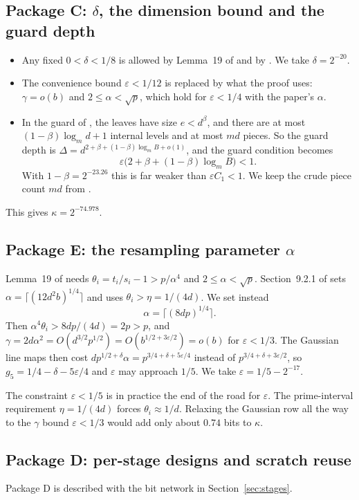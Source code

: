 \subsection{Package C: $\delta$, the dimension bound and the guard depth}
\begin{itemize}[leftmargin=*]
\item Any fixed $0<\delta<1/8$ is allowed by Lemma~19 of \cite{OAI} and by \cite[Lemma~2.12]{HvdH}. We take $\delta = 2^{-20}$.
\item The convenience bound $\varepsilon < 1/12$ is replaced by what the proof uses: $\gamma = o(b)$ and $2 \le \alpha < \sqrt p$, which hold for $\varepsilon < 1/4$ with the paper's $\alpha$.
\item In the guard of \cite[Prop.~14]{OAI}, the leaves have size $e < d^\beta$, and there are at most $(1-\beta)\log_m d + 1$ internal levels and at most $md$ pieces. So the guard depth is $\Delta = d^{2+\beta+(1-\beta)\log_m B + o(1)}$, and the guard condition becomes
\[
\varepsilon\bigl(2+\beta+(1-\beta)\log_m B\bigr) < 1 .
\]
With $1-\beta = 2^{-23.26}$ this is far weaker than $\varepsilon C_1 < 1$. We keep the crude piece count $md$ from \cite{OAI}.
\end{itemize}
This gives $\kappa = 2^{-74.978}$.

\subsection{Package E: the resampling parameter $\alpha$}
Lemma~19 of \cite{OAI} needs $\theta_i = t_i/s_i - 1 > p/\alpha^4$ and $2 \le \alpha < \sqrt p$. Section~9.2.1 of \cite{OAI} sets $\alpha = \lceil (12 d^2 b)^{1/4}\rceil$ and uses $\theta_i > \eta = 1/(4d)$. We set instead
\[
\alpha = \bigl\lceil (8dp)^{1/4} \bigr\rceil .
\]
Then $\alpha^4\theta_i > 8dp/(4d) = 2p > p$, and $\gamma = 2d\alpha^2 = O(d^{3/2}p^{1/2}) = O(b^{1/2+3\varepsilon/2}) = o(b)$ for $\varepsilon < 1/3$. The Gaussian line maps then cost $dp^{1/2+\delta}\alpha = p^{3/4+\delta+5\varepsilon/4}$ instead of $p^{3/4+\delta+3\varepsilon/2}$, so $g_5 = 1/4 - \delta - 5\varepsilon/4$ and $\varepsilon$ may approach $1/5$. We take $\varepsilon = 1/5 - 2^{-17}$.

The constraint $\varepsilon < 1/5$ is in practice the end of the road for $\varepsilon$. The prime-interval requirement $\eta = 1/(4d)$ forces $\theta_i \approx 1/d$. Relaxing the Gaussian row all the way to the $\gamma$ bound $\varepsilon<1/3$ would add only about $0.74$ bits to $\kappa$.

\subsection{Package D: per-stage designs and scratch reuse}
Package D is described with the bit network in Section~\ref{sec:stages}.
